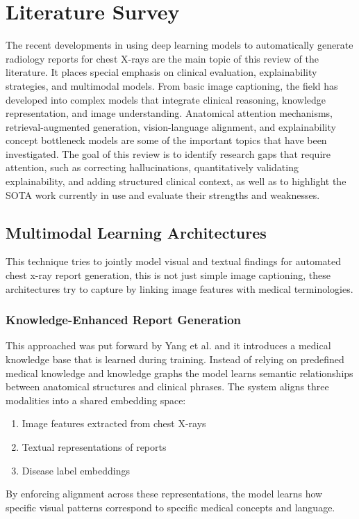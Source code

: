 \chapter{Literature Survey}
\graphicspath{{Chapter2/}}
The recent developments in using deep learning models to automatically generate radiology reports for chest X-rays are the main topic of this review of the literature. It places special emphasis on clinical evaluation, explainability strategies, and multimodal models. From basic image captioning, the field has developed into complex models that integrate clinical reasoning, knowledge representation, and image understanding. Anatomical attention mechanisms, retrieval-augmented generation, vision-language alignment, and explainability concept bottleneck models are some of the important topics that have been investigated. The goal of this review is to identify research gaps that require attention, such as correcting hallucinations, quantitatively validating explainability, and adding structured clinical context, as well as to highlight the SOTA work currently in use and evaluate their strengths and weaknesses.
\section{Multimodal Learning Architectures}
This technique tries to jointly model visual and textual findings for automated chest x-ray report generation, this is not just simple image captioning, these architectures try to capture by linking image features with medical terminologies.
\subsection{Knowledge-Enhanced Report Generation}
This approached was put forward by Yang et al. and it introduces a medical knowledge base that is learned during training. Instead of relying on predefined medical knowledge and knowledge graphs the model learns semantic relationships between anatomical structures and clinical phrases.
The system aligns three modalities into a shared embedding space:
\begin{enumerate}
    \item Image features extracted from chest X-rays
    \item Textual representations of reports
    \item Disease label embeddings
\end{enumerate}
By enforcing alignment across these representations, the model learns how specific visual patterns correspond to specific medical concepts and language.
